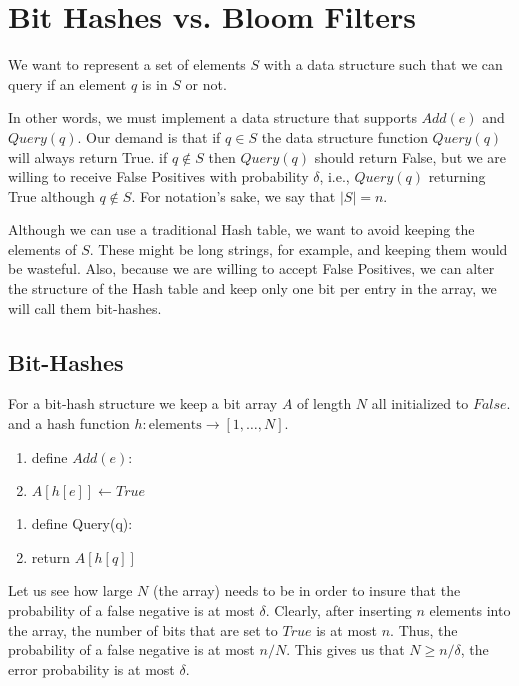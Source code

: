 \documentclass{article}
\begin{document}


\section*{Bit Hashes vs. Bloom Filters}

We want to represent a set of elements $S$ with a data structure such that
we can query if an element $q$ is in $S$ or not.

In other words, we must implement a data structure that supports $Add(e)$ and 
$Query(q)$. Our demand is that if $q\in S$ the data structure function $Query(q)$ will always return True.
if $q \not\in S$ then $Query(q)$ should return False, but we are willing to receive False Positives with probability $\delta$, i.e., $Query(q)$ returning True although $q \not\in S$.
For notation's sake, we say that $|S| = n$.

Although we can use a traditional Hash table, we want to avoid keeping the elements of $S$.
These might be long strings, for example, and keeping them would be wasteful.  
Also, because we are willing to accept False Positives, we can alter the structure of the Hash table 
and keep only one bit per entry in the array, we will call them bit-hashes.

\subsection*{Bit-Hashes}
For a bit-hash structure we keep a bit array $A$ of length $N$ all initialized to $False$.
and a hash function $h: \mbox{elements} \rightarrow [1,\ldots,N]$.

\begin{enumerate}
\item define  $Add(e)$:
\item \tab $A[h[e]] \leftarrow True$ 
\end{enumerate}


\begin{enumerate}
\item define  Query(q):
\item \tab return $A[h[q]]$ 
\end{enumerate}

Let us see how large $N$ (the array) needs to be in order to insure that the probability of a 
false negative is at most $\delta$. 
Clearly, after inserting $n$ elements into the array, the number of bits that are set to $True$ 
is at most $n$. Thus, the probability of a false negative is at most $n/N$.
This gives us that $N \ge n/\delta$, the error probability is at most $\delta$.
\end{document}
